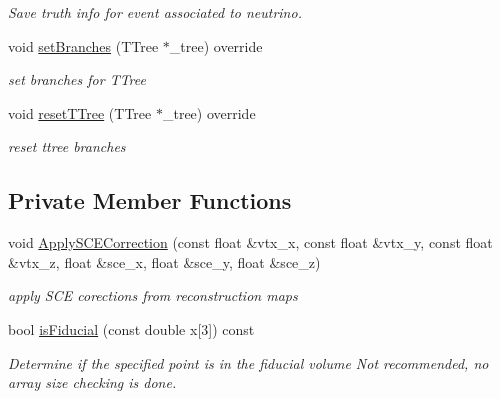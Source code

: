 \begin{DoxyCompactItemize}
\begin{DoxyCompactList}\small\item\em Save truth info for event associated to neutrino. \end{DoxyCompactList}\item 
void \hyperlink{classanalysis_1_1DefaultAnalysis_a95b4abd17b0d77b436f5f6ae43e641c7}{set\+Branches} (T\+Tree $\ast$\+\_\+tree) override\hypertarget{classanalysis_1_1DefaultAnalysis_a95b4abd17b0d77b436f5f6ae43e641c7}{}\label{classanalysis_1_1DefaultAnalysis_a95b4abd17b0d77b436f5f6ae43e641c7}

\begin{DoxyCompactList}\small\item\em set branches for T\+Tree \end{DoxyCompactList}\item 
void \hyperlink{classanalysis_1_1DefaultAnalysis_a732ca63923ff91a3928dc437c2e04adf}{reset\+T\+Tree} (T\+Tree $\ast$\+\_\+tree) override\hypertarget{classanalysis_1_1DefaultAnalysis_a732ca63923ff91a3928dc437c2e04adf}{}\label{classanalysis_1_1DefaultAnalysis_a732ca63923ff91a3928dc437c2e04adf}

\begin{DoxyCompactList}\small\item\em reset ttree branches \end{DoxyCompactList}\end{DoxyCompactItemize}
\subsection*{Private Member Functions}
\begin{DoxyCompactItemize}
\item 
void \hyperlink{classanalysis_1_1DefaultAnalysis_a248e4a44368e7c8a632242fa7e171ade}{Apply\+S\+C\+E\+Correction} (const float \&vtx\+\_\+x, const float \&vtx\+\_\+y, const float \&vtx\+\_\+z, float \&sce\+\_\+x, float \&sce\+\_\+y, float \&sce\+\_\+z)\hypertarget{classanalysis_1_1DefaultAnalysis_a248e4a44368e7c8a632242fa7e171ade}{}\label{classanalysis_1_1DefaultAnalysis_a248e4a44368e7c8a632242fa7e171ade}

\begin{DoxyCompactList}\small\item\em apply S\+CE corections from reconstruction maps \end{DoxyCompactList}\item 
bool \hyperlink{classanalysis_1_1DefaultAnalysis_a51efe899f0117f479c9f833663c7111f}{is\+Fiducial} (const double x\mbox{[}3\mbox{]}) const 
\begin{DoxyCompactList}\small\item\em Determine if the specified point is in the fiducial volume Not recommended, no array size checking is done. \end{DoxyCompactList}\end{DoxyCompactItemize}
